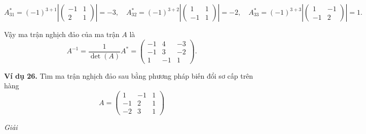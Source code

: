 \[
A_{31}^* = (-1)^{3+1} \left| \begin{pmatrix}
-1 & 1 \\
2 & 1
\end{pmatrix} \right| = -3, \quad A_{32}^* = (-1)^{3+2} \left| \begin{pmatrix}
1 & 1 \\
-1 & 1
\end{pmatrix} \right| = -2, \quad A_{33}^* = (-1)^{3+3} \left| \begin{pmatrix}
1 & -1 \\
-1 & 2
\end{pmatrix} \right| = 1.
\]

Vậy ma trận nghịch đảo của ma trận \(A\) là
\[
A^{-1} = \frac{1}{\det(A)} A^* = \begin{pmatrix}
-1 & 4 & -3 \\
-1 & 3 & -2 \\
1 & -1 & 1
\end{pmatrix}.
\]

\textbf{Ví dụ 26.} Tìm ma trận nghịch đảo sau bằng phương pháp biến đổi sơ cấp trên hàng
\[
A = \begin{pmatrix}
1 & -1 & 1 \\
-1 & 2 & 1 \\
-2 & 3 & 1
\end{pmatrix}
\]

\textit{Giải}

